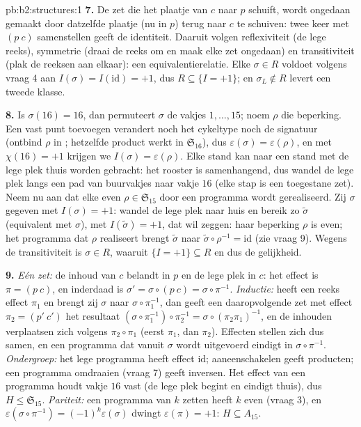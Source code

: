 \begin{solution}{pb:b2:structures:1}
\textbf{7.} De zet die het plaatje van $c$ naar $p$ schuift, wordt
ongedaan gemaakt door datzelfde plaatje (nu in $p$) terug naar $c$
te schuiven: twee keer met $(p\ c)$ samenstellen geeft de
identiteit. Daaruit volgen reflexiviteit (de lege reeks),
symmetrie (draai de reeks om en maak elke zet ongedaan) en
transitiviteit (plak de reeksen aan elkaar): een
equivalentierelatie. Elke $\sigma \in R$ voldoet volgens vraag 4
aan $I(\sigma) = I(\mathrm{id}) = +1$, dus $R \subseteq \{I =
+1\}$; en $\sigma_L \notin R$ levert een tweede klasse.

\textbf{8.} Is $\sigma(16) = 16$, dan permuteert $\sigma$ de
vakjes $1, \dots, 15$; noem $\rho$ die beperking. Een vast punt
toevoegen verandert noch het cykeltype noch de signatuur (ontbind
$\rho$ in ; hetzelfde product werkt in
$\mathfrak{S}_{16}$), dus $\varepsilon(\sigma) =
\varepsilon(\rho)$, en met $\chi(16) = +1$ krijgen we $I(\sigma) =
\varepsilon(\rho)$. Elke stand kan naar een stand met de lege plek
thuis worden gebracht: het rooster is samenhangend, dus wandel de
lege plek langs een pad van buurvakjes naar vakje $16$ (elke stap
is een toegestane zet). Neem nu aan dat elke even $\rho \in
\mathfrak{S}_{15}$ door een programma wordt gerealiseerd. Zij
$\sigma$ gegeven met $I(\sigma) = +1$: wandel de lege plek naar
huis en bereik zo $\widetilde\sigma$ (equivalent met $\sigma$),
met $I(\widetilde\sigma) = +1$, dat wil zeggen: haar beperking
$\rho$ is even; het programma dat $\rho$ realiseert brengt
$\widetilde\sigma$ naar $\widetilde\sigma \circ \rho^{-1} =
\mathrm{id}$ (zie vraag 9). Wegens de transitiviteit is $\sigma
\in R$, waaruit $\{I = +1\} \subseteq R$ en dus de gelijkheid.

\textbf{9.} \emph{Eén zet:} de inhoud van $c$ belandt in $p$ en de
lege plek in $c$: het effect is $\pi = (p\ c)$, en inderdaad is
$\sigma' = \sigma \circ (p\ c) = \sigma \circ \pi^{-1}$.
\emph{Inductie:} heeft een reeks effect $\pi_1$ en brengt zij
$\sigma$ naar $\sigma \circ \pi_1^{-1}$, dan geeft een
daaropvolgende zet met effect $\pi_2 = (p'\ c')$ het resultaat
$(\sigma \circ \pi_1^{-1}) \circ \pi_2^{-1} = \sigma \circ
(\pi_2\pi_1)^{-1}$, en de inhouden verplaatsen zich volgens $\pi_2
\circ \pi_1$ (eerst $\pi_1$, dan $\pi_2$). Effecten stellen zich
dus samen, en een programma dat vanuit $\sigma$ wordt uitgevoerd
eindigt in $\sigma \circ \pi^{-1}$. \emph{Ondergroep:} het lege
programma heeft effect $\mathrm{id}$; aaneenschakelen geeft
producten; een programma omdraaien (vraag 7) geeft inversen. Het
effect van een programma houdt vakje $16$ vast (de lege plek
begint en eindigt thuis), dus $H \leq \mathfrak{S}_{15}$.
\emph{Pariteit:} een programma van $k$ zetten heeft $k$ even
(vraag 3), en $\varepsilon(\sigma \circ \pi^{-1}) =
(-1)^k\varepsilon(\sigma)$ dwingt $\varepsilon(\pi) = +1$: $H
\subseteq A_{15}$.


\end{solution}
